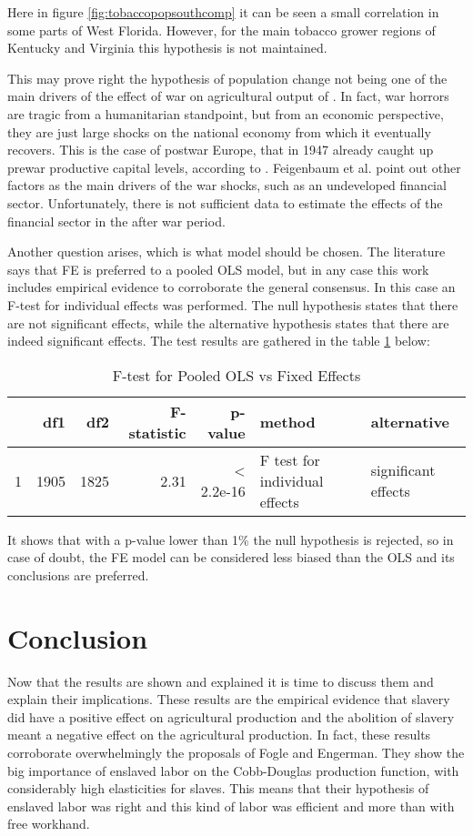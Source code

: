 \documentclass[12pt]{report}
\begin{document}
Here in figure \ref{fig:tobaccopopsouthcomp} it can be seen a small correlation in some parts of West Florida. However, for the main tobacco grower regions of Kentucky and Virginia this hypothesis is not maintained.

This may prove right the hypothesis of population change not being one of the main drivers of the effect of war on agricultural output of \citet{feigenbaum2018capital}. In fact, war horrors are tragic from a humanitarian standpoint, but from an economic perspective, they are just large shocks on the national economy from which it eventually recovers. This is the case of postwar Europe, that in 1947 already caught up prewar productive capital levels, according to \citet[52]{eichengreen2008european}. Feigenbaum et al. point out other factors as the main drivers of the war shocks, such as an undeveloped financial sector. Unfortunately, there is not sufficient data to estimate the effects of the financial sector in the after war period.

Another question arises, which is what model should be chosen. The literature says that FE is preferred to a pooled OLS model, but in any case this work includes empirical evidence to corroborate the general consensus. In this case an F-test for individual effects was performed. The null hypothesis states that there are not significant effects, while the alternative hypothesis states that there are indeed significant effects. The test results are gathered in the table \ref{tab:pFtest} below:
\begin{table}[ht]
\centering
\caption{F-test for Pooled OLS vs Fixed Effects}
\label{tab:pFtest}
\begin{tabular}{rrrrrll}
  \hline
 & df1 & df2 & F-statistic & p-value & method & alternative \\ 
  \hline
1 & 1905 & 1825 & 2.31 & < 2.2e-16 & F test for individual effects & significant effects \\ 
   \hline
\end{tabular}
\end{table}

It shows that with a p-value lower than 1\% the null hypothesis is rejected, so in case of doubt, the FE model can be considered less biased than the OLS and its conclusions are preferred.



\chapter{Conclusion}
Now that the results are shown and explained it is time to discuss them and explain their implications. These results are the empirical evidence that slavery did have a positive effect on agricultural production and the abolition of slavery meant a negative effect on the agricultural production. In fact, these results corroborate overwhelmingly the proposals of Fogle and Engerman. They show the big importance of enslaved labor on the Cobb-Douglas production function, with considerably high elasticities for slaves. This means that their hypothesis of enslaved labor was right and this kind of labor was efficient and more than with free workhand. 
\end{document}
